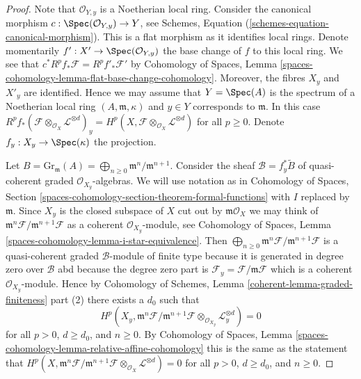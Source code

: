 \begin{proof}
Note that $\mathcal{O}_{Y, y}$ is a Noetherian local ring.
Consider the canonical morphism
$c : \Spec(\mathcal{O}_{Y, y}) \to Y$, see
Schemes, Equation (\ref{schemes-equation-canonical-morphism}).
This is a flat morphism as it identifies local rings.
Denote momentarily $f' : X' \to \Spec(\mathcal{O}_{Y, y})$
the base change of $f$ to this local ring. We see that
$c^*R^pf_*\mathcal{F} = R^pf'_*\mathcal{F}'$ by
Cohomology of Spaces, Lemma
\ref{spaces-cohomology-lemma-flat-base-change-cohomology}.
Moreover, the fibres $X_y$ and $X'_y$ are identified.
Hence we may assume that $Y = \Spec(A)$ is the spectrum of
a Noetherian local ring $(A, \mathfrak m, \kappa)$ and $y \in Y$
corresponds to $\mathfrak m$. In this case
$R^pf_*(\mathcal{F} \otimes_{\mathcal{O}_X} \mathcal{L}^{\otimes d})_y =
H^p(X, \mathcal{F} \otimes_{\mathcal{O}_X} \mathcal{L}^{\otimes d})$
for all $p \geq 0$. Denote $f_y : X_y \to \Spec(\kappa)$ the projection.

\medskip\noindent
Let $B = \text{Gr}_\mathfrak m(A) =
\bigoplus_{n \geq 0} \mathfrak m^n/\mathfrak m^{n + 1}$.
Consider the sheaf $\mathcal{B} = f_y^*\widetilde{B}$
of quasi-coherent graded $\mathcal{O}_{X_y}$-algebras.
We will use notation as in Cohomology of Spaces, Section
\ref{spaces-cohomology-section-theorem-formal-functions}
with $I$ replaced by $\mathfrak m$.
Since $X_y$ is the closed subspace of $X$ cut out by
$\mathfrak m\mathcal{O}_X$ we may think of
$\mathfrak m^n\mathcal{F}/\mathfrak m^{n + 1}\mathcal{F}$
as a coherent $\mathcal{O}_{X_y}$-module, see
Cohomology of Spaces, Lemma \ref{spaces-cohomology-lemma-i-star-equivalence}.
Then
$\bigoplus_{n \geq 0} \mathfrak m^n\mathcal{F}/\mathfrak m^{n + 1}\mathcal{F}$
is a quasi-coherent graded $\mathcal{B}$-module of finite type
because it is generated in degree zero over $\mathcal{B}$
abd because the degree zero part is
$\mathcal{F}_y = \mathcal{F}/\mathfrak m \mathcal{F}$
which is a coherent $\mathcal{O}_{X_y}$-module.
Hence by Cohomology of Schemes, Lemma
\ref{coherent-lemma-graded-finiteness} part (2)
there exists a $d_0$ such that
$$
H^p(X_y, \mathfrak m^n \mathcal{F}/ \mathfrak m^{n + 1}\mathcal{F}
\otimes_{\mathcal{O}_{X_y}} \mathcal{L}_y^{\otimes d}) = 0
$$
for all $p > 0$, $d \geq d_0$, and $n \geq 0$. By
Cohomology of Spaces, Lemma
\ref{spaces-cohomology-lemma-relative-affine-cohomology}
this is the same as the statement that
$
H^p(X, \mathfrak m^n \mathcal{F}/ \mathfrak m^{n + 1}\mathcal{F}
\otimes_{\mathcal{O}_X} \mathcal{L}^{\otimes d}) = 0
$
for all $p > 0$, $d \geq d_0$, and $n \geq 0$.


\end{proof}
